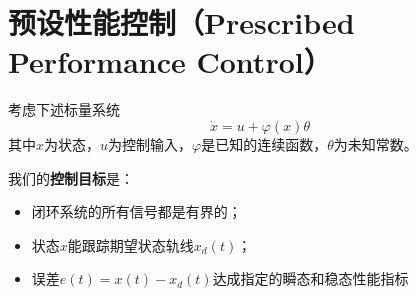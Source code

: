 \section{预设性能控制（Prescribed Performance Control）}\label{4Fref}

考虑下述标量系统
\begin{equation*}
    \dot{x} = u + \varphi(x)\theta
\end{equation*}
其中$x$为状态，$u$为控制输入，$\varphi$是已知的连续函数，$\theta$为未知常数。

我们的{\bf 控制目标}是：
\begin{itemize}[leftmargin=1em]
    \item 闭环系统的所有信号都是有界的；
    \item 状态$x$能跟踪期望状态轨线$x_d(t)$；
    \item 误差$e(t)=x(t)-x_d(t)$达成指定的瞬态和稳态性能指标
\end{itemize}

